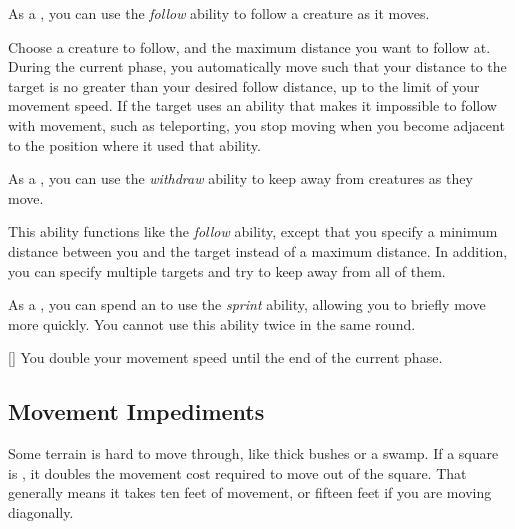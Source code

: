          As a , you can use the \textit{follow} ability to follow a creature as it moves.

        \begin{freeability}{}
            Choose a creature to follow, and the maximum distance you want to follow at.
            During the current phase, you automatically move such that your distance to the target is no greater than your desired follow distance, up to the limit of your movement speed.
            If the target uses an ability that makes it impossible to follow with movement, such as teleporting, you stop moving when you become adjacent to the position where it used that ability.
        \end{freeability}

         As a , you can use the \textit{withdraw} ability to keep away from creatures as they move.

        \begin{freeability}{}
            This ability functions like the \textit{follow} ability, except that you specify a minimum distance between you and the target instead of a maximum distance.
            In addition, you can specify multiple targets and try to keep away from all of them.
        \end{freeability}

         As a , you can spend an  to use the \textit{sprint} ability, allowing you to briefly move more quickly.
        You cannot use this ability twice in the same round.

        \begin{freeability}{}[]
            You double your movement speed until the end of the current phase.
        \end{freeability}

    \subsection{Movement Impediments}

        \label{Difficult Terrain}
        Some terrain is hard to move through, like thick bushes or a swamp.
        If a square is , it doubles the movement cost required to move out of the square.
        That generally means it takes ten feet of movement, or fifteen feet if you are moving diagonally.

